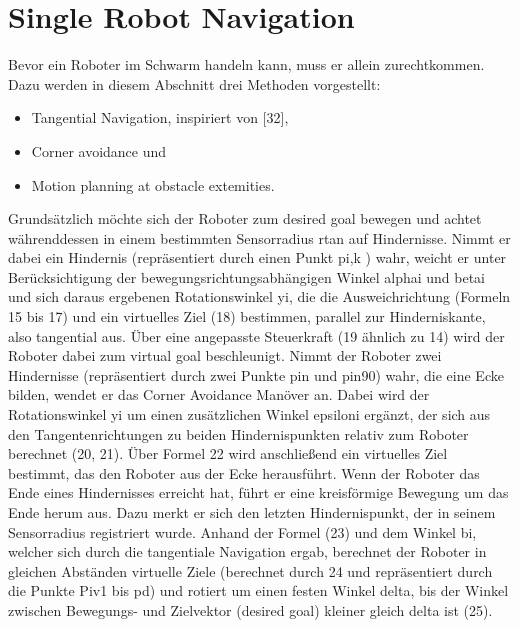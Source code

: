 \documentclass[conference]{IEEEtran}
\begin{document}
\section{Single Robot Navigation}
Bevor ein Roboter im Schwarm handeln kann, muss er allein zurechtkommen. Dazu werden in diesem Abschnitt drei Methoden vorgestellt:
\begin{itemize}
    \item Tangential Navigation, inspiriert von [32],
    \item Corner avoidance und
    \item Motion planning at obstacle extemities.
\end{itemize}
Grundsätzlich möchte sich der Roboter zum desired goal bewegen und achtet währenddessen in einem bestimmten Sensorradius rtan auf Hindernisse. Nimmt er dabei ein Hindernis (repräsentiert durch einen Punkt pi,k ) wahr, weicht er unter Berücksichtigung der bewegungsrichtungsabhängigen Winkel alphai und betai und sich daraus ergebenen Rotationswinkel yi, die die Ausweichrichtung (Formeln 15 bis 17) und ein virtuelles Ziel (18) bestimmen, parallel zur Hinderniskante, also tangential aus. Über eine angepasste Steuerkraft (19 ähnlich zu 14) wird der Roboter dabei zum virtual goal beschleunigt.
Nimmt der Roboter zwei Hindernisse (repräsentiert durch zwei Punkte pin und pin90) wahr, die eine Ecke bilden, wendet er das Corner Avoidance Manöver an. Dabei wird der Rotationswinkel yi um einen zusätzlichen Winkel epsiloni ergänzt, der sich aus den Tangentenrichtungen zu beiden Hindernispunkten relativ zum Roboter berechnet (20, 21). Über Formel 22 wird anschließend ein virtuelles Ziel bestimmt, das den Roboter aus der Ecke herausführt.
Wenn der Roboter das Ende eines Hindernisses erreicht hat, führt er eine kreisförmige Bewegung um das Ende herum aus. Dazu merkt er sich den letzten Hindernispunkt, der in seinem Sensorradius registriert wurde. Anhand der Formel (23) und dem Winkel bi, welcher sich durch die tangentiale Navigation ergab, berechnet der Roboter in gleichen Abständen virtuelle Ziele (berechnet durch 24 und repräsentiert durch die Punkte Piv1 bis pd) und rotiert um einen festen Winkel delta, bis der Winkel zwischen Bewegungs- und Zielvektor (desired goal) kleiner gleich delta ist (25).
\end{document}
